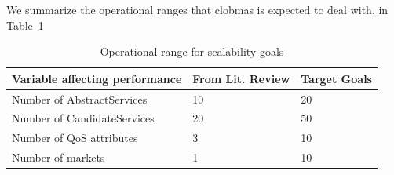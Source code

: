 \documentclass[10pt,journal,compsoc]{IEEEtran}
\begin{document}
We summarize the operational ranges that clobmas is expected to deal with, in Table~\ref{tbl:scalability_targets}
\begin{table}[H]
\centering
\begin{tabular}{p{4cm}p{2.2cm}p{1.7cm}}
	\toprule
	\textbf{Variable affecting performance} & \textbf{From Lit. Review} & \textbf{Target Goals}\\ 
	\midrule
	Number of AbstractServices & \hspace{0.45cm}10 & \hspace{0.2cm}20 \\ 
	Number of CandidateServices  & \hspace{0.45cm}20 & \hspace{0.2cm}50 \\ 
	Number of QoS attributes & \hspace{0.45cm}3 & \hspace{0.2cm}10 \\ 
	Number of markets & \hspace{0.45cm}1 & \hspace{0.2cm}10 \\ 
	\bottomrule
\end{tabular}
\caption{Operational range for scalability goals \label{tbl:scalability_targets}}
\end{table}
\end{document}
